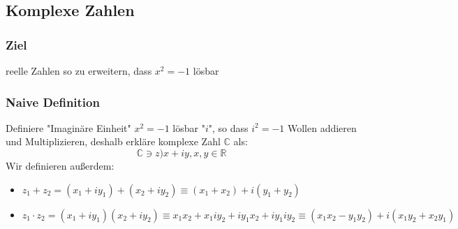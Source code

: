 \documentclass[a4paper]{scrartcl}
\theoremstyle{definition}
\theoremstyle{plain}
\theoremstyle{remark}
\newcommand{\I}{\ensuremath{i}}%
\begin{document}
\subsection{Komplexe Zahlen}
\label{sec-5-1}
\subsubsection{Ziel}
\label{sec-5-1-1}
reelle Zahlen so zu erweitern, dass $x^2 = - 1$ lösbar
\subsubsection{Naive Definition}
\label{sec-5-1-2}
Definiere "Imaginäre Einheit" $x^2 = -1$ lösbar "$\I$", so dass $\I^2 = -1$
Wollen addieren und Multiplizieren, deshalb erkläre komplexe Zahl $\mathbb{C}$ als:
\[\mathbb{C} \ni z ) x + \I y, x,y\in\mathbb{R}\]
Wir definieren außerdem:
\begin{itemize}
\item $z_1 + z_2 = (x_1 + \I y_1) + (x_2 + \I y_2) \equiv (x_1 + x_2) + \I(y_1 + y_2)$
\item $z_1 \cdot z_2 = (x_1 + \I y_1) (x_2 + \I y_2) \equiv x_1 x_2 + x_1 \I y_2 + \I y_1 x_2 + \I y_1 \I y_2 \equiv (x_1 x_2 - y_1 y_2) + i(x_1 y_2 + x_2 y_1)$
\end{itemize}
\end{document}
